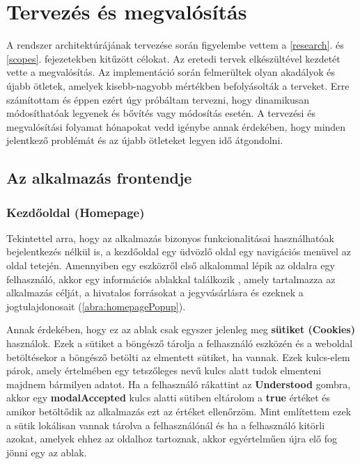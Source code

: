 \chapter{Tervezés és megvalósítás}

A rendszer architektúrájának tervezése során figyelembe vettem a \ref{research}. és \ref{scopes}. fejezetekben kitűzött célokat. Az eretedi tervek elkészültével kezdetét vette a megvalósítás. Az implementáció során felmerültek olyan akadályok és újabb ötletek, amelyek kisebb-nagyobb mértékben befolyásolták a terveket. Erre számítottam és éppen ezért úgy próbáltam tervezni, hogy dinamikusan módosíthatóak legyenek és bővítés vagy módosítás esetén. A tervezési és megvalósítási folyamat hónapokat vedd igénybe annak érdekében, hogy minden jelentkező problémát és az újabb ötleteket legyen idő átgondolni.

\section {Az alkalmazás frontendje}

\subsection {Kezdőoldal (Homepage)}

Tekintettel arra, hogy az alkalmazás bizonyos funkcionalitásai használhatóak bejelentkezés nélkül is, a kezdőoldal egy üdvözlő oldal egy navigációs menüvel az oldal tetején. Amennyiben egy eszközről első alkalommal lépik az oldalra egy felhasználó, akkor egy információs ablakkal találkozik \cite{Modal}, amely tartalmazza az alkalmazás célját, a hivatalos forrásokat a jegyvásárlásra és ezeknek a jogtulajdonosait (\ref{abra:homepagePopup}).

Annak érdekében, hogy ez az ablak csak egyszer jelenleg meg \textbf{sütiket (Cookies)} használok. Ezek a sütiket a böngésző tárolja a felhasználó eszközén és a weboldal betöltésekor a böngésző betölti az elmentett sütiket, ha vannak. Ezek kulcs-elem párok, amely értelmében egy tetszőleges nevű kulcs alatt tudok elmenteni majdnem bármilyen adatot. Ha a felhasználó rákattint az \textbf{Understood} gombra, akkor egy \textbf{modalAccepted} kulcs alatti sütiben eltárolom a \textbf{true} értéket és amikor betöltődik az alkalmazás ezt az értéket ellenőrzöm.
Mint említettem ezek a sütik lokálisan vannak tárolva a felhasználónál és ha a felhasználó kitörli azokat, amelyek ehhez az oldalhoz tartoznak, akkor egyértelműen újra elő fog jönni egy az ablak.


